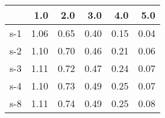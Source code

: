 \begin{tabular}{lrrrrr}
\toprule
{} &  1.0 &  2.0 &  3.0 &  4.0 &  5.0 \\
\midrule
s-1 & 1.06 & 0.65 & 0.40 & 0.15 & 0.04 \\
s-2 & 1.10 & 0.70 & 0.46 & 0.21 & 0.06 \\
s-3 & 1.11 & 0.72 & 0.47 & 0.24 & 0.07 \\
s-4 & 1.10 & 0.73 & 0.49 & 0.25 & 0.07 \\
s-8 & 1.11 & 0.74 & 0.49 & 0.25 & 0.08 \\
\bottomrule
\end{tabular}
